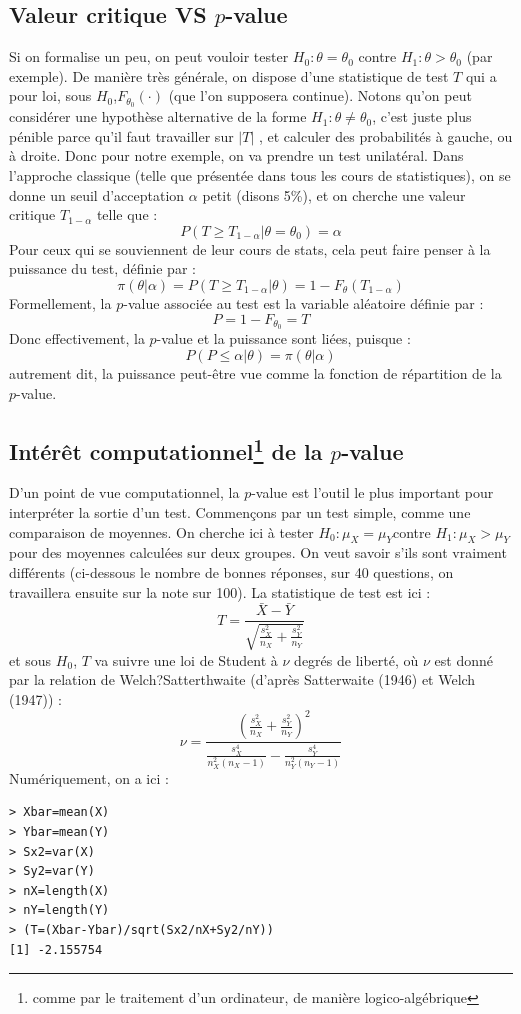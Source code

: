 \subsection*{Valeur critique VS $p$-value}

Si on formalise un peu, on peut vouloir tester $H_{0} : \theta = \theta_{0}$ contre $H_{1} : \theta > \theta_{0}$ (par exemple). De manière très générale, on dispose d'une statistique de test $T$ qui a pour loi, sous $H_{0}$,$F_{\theta_{0}}(\cdot)$ (que l'on supposera continue). Notons qu'on peut considérer une hypothèse alternative de la forme $H_{1} : \theta \neq \theta_{0}$, c'est juste plus pénible parce qu'il faut travailler sur $|T|$ , et calculer des probabilités à gauche, ou à droite. Donc pour notre exemple, on va prendre un test unilatéral.\newline
Dans l'approche classique (telle que présentée dans tous les cours de statistiques), on se donne un seuil d'acceptation $\alpha$  petit (disons 5\%), et on cherche une valeur critique $T_{1-\alpha}$ telle que :
$$P(T\geq T_{1-\alpha} | \theta = \theta_{0})=\alpha$$
Pour ceux qui se souviennent de leur cours de stats, cela peut faire penser à la puissance du test, définie par :
$$\pi(\theta | \alpha) = P(T\geq T_{1-\alpha} | \theta) = 1 - F_{\theta}(T_{1-\alpha})$$
Formellement, la $p$-value associée au test  est la variable aléatoire  définie par :
$$P=1-F_{\theta_{0}} = T$$
Donc effectivement, la $p$-value et la puissance sont liées, puisque : 
$$P(P\leq \alpha | \theta) = \pi(\theta |\alpha)$$
autrement dit, la puissance peut-être vue comme la fonction de répartition de la $p$-value.

\subsection*{Intérêt computationnel\footnote{comme par le traitement d'un ordinateur, de manière logico-algébrique  } de la $p$-value}

D'un point de vue computationnel, la $p$-value est l'outil le plus important pour interpréter la sortie d'un test. \newline Commençons par un test simple, comme une comparaison de moyennes. On cherche ici à tester  $H_{0} : \mu_{X} = \mu_{Y}$contre $H_{1} : \mu_{X} > \mu_{Y} $ pour des moyennes calculées sur deux groupes. On veut savoir s'ils sont vraiment différents (ci-dessous le nombre de bonnes réponses, sur 40 questions, on travaillera ensuite sur la note sur 100).\newline
La statistique de test est ici : 
$$T=\frac{\bar{X}-\bar{Y}}{\sqrt{\frac{s_{X}^{2}}{n_{X}}+\frac{s_{Y}^{2}}{n_{Y}}}}$$
et sous $H_{0}$, $T$ va suivre une loi de Student à $\nu$ degrés de liberté, où $\nu$ est donné par la relation de Welch?Satterthwaite (d'après Satterwaite (1946) et Welch (1947)) : 
$$\nu = \frac{(\frac{s_{X}^{2}}{n_{X}}+\frac{s_{Y}^{2}}{n_{Y}})^{2}}{\frac{s_{X}^{4}}{n^{2}_{X}(n_{X}-1)} - \frac{s_{Y}^{4}}{n^{2}_{Y}(n_{Y}-1)}}$$
Numériquement, on a ici : 
\begin{lstlisting}[language=html]
> Xbar=mean(X)
> Ybar=mean(Y)
> Sx2=var(X)
> Sy2=var(Y)
> nX=length(X)
> nY=length(Y)
> (T=(Xbar-Ybar)/sqrt(Sx2/nX+Sy2/nY))
[1] -2.155754
\end{lstlisting}

